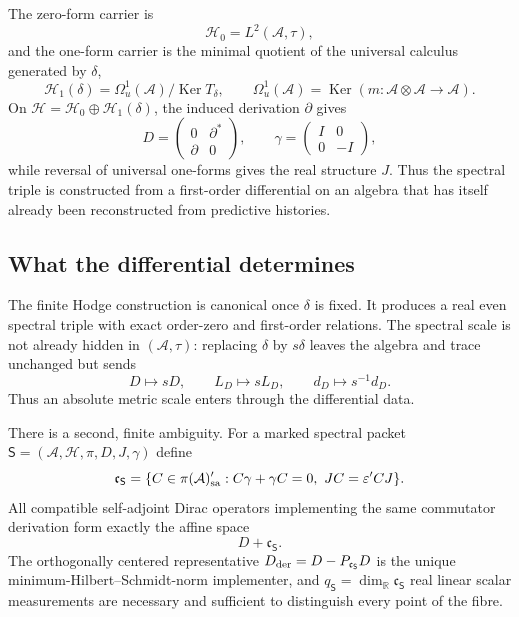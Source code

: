 \documentclass[11pt]{article}
\theoremstyle{definition}
\theoremstyle{remark}
\theoremstyle{definition}
\theoremstyle{remark}
\newcommand{\R}{\mathbb R}
\newcommand{\Ker}{\operatorname{Ker}}
\newcommand{\A}{\mathcal A}
\newcommand{\Hh}{\mathcal H}
\newcommand{\Om}{\Omega}
\begin{document}
The zero-form carrier is
\begin{equation}
\Hh_0=L^2(\A,\tau),
\label{eq:summary-H0}
\end{equation}
and the one-form carrier is the minimal quotient of the universal calculus
generated by $\delta$,
\begin{equation}
\Hh_1(\delta)=\Om_u^1(\A)/\Ker T_\delta,
\qquad
\Om_u^1(\A)=\Ker(m:\A\otimes\A\to\A).
\label{eq:summary-H1}
\end{equation}
On $\Hh=\Hh_0\oplus\Hh_1(\delta)$, the induced derivation $\partial$ gives
\begin{equation}
D=\begin{pmatrix}0&\partial^*\\ \partial&0\end{pmatrix},
\qquad
\gamma=\begin{pmatrix}I&0\\0&-I\end{pmatrix},
\label{eq:summary-D}
\end{equation}
while reversal of universal one-forms gives the real structure $J$.  Thus the
spectral triple is constructed from a first-order differential on an algebra that
has itself already been reconstructed from predictive histories.

\subsection{What the differential determines}

The finite Hodge construction is canonical once $\delta$ is fixed.  It produces a
real even spectral triple with exact order-zero and first-order relations.  The
spectral scale is not already hidden in $(\A,\tau)$: replacing $\delta$ by
$s\delta$ leaves the algebra and trace unchanged but sends
\begin{equation}
D\longmapsto sD,
\qquad
L_D\longmapsto sL_D,
\qquad
d_D\longmapsto s^{-1}d_D.
\label{eq:summary-scale}
\end{equation}
Thus an absolute metric scale enters through the differential data.

There is a second, finite ambiguity.  For a marked spectral packet
$\mathsf S=(\A,\Hh,\pi,D,J,\gamma)$ define
\begin{equation}
\mathfrak c_{\mathsf S}
=\{C\in\pi(\A)'_{\rm sa}: C\gamma+\gamma C=0,\ JC=\varepsilon'CJ\}.
\label{eq:summary-commutant}
\end{equation}
All compatible self-adjoint Dirac operators implementing the same commutator
derivation form exactly the affine space
\begin{equation}
D+\mathfrak c_{\mathsf S}.
\label{eq:summary-affine}
\end{equation}
The orthogonally centered representative
$D_{\rm der}=D-P_{\mathfrak c_{\mathsf S}}D$ is the unique
minimum-Hilbert--Schmidt-norm implementer, and
$q_{\mathsf S}=\dim_{\R}\mathfrak c_{\mathsf S}$ real linear scalar measurements are
necessary and sufficient to distinguish every point of the fibre.
\end{document}
